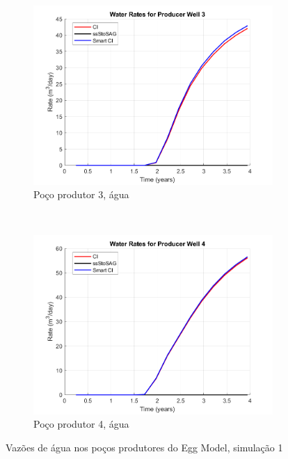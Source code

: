 \begin{figure}[!ht]
	\begin{subfigure}[b]{.45\textwidth}
		\includegraphics[width=\textwidth]{figs/resultadosEgg/imgsim1/EGG_WaterWell3_Zoom}
		\caption{Po\c{c}o produtor 3, \'{a}gua}
		\label{EGG1_WaterWell3}
	\end{subfigure}
	~
	\begin{subfigure}[b]{.45\textwidth}
		\includegraphics[width=\textwidth]{figs/resultadosEgg/imgsim1/EGG_WaterWell4_Zoom}
		\caption{Po\c{c}o produtor 4, \'{a}gua}
		\label{EGG1_WaterWell4}
	\end{subfigure}
\caption{Vaz\~{o}es de \'{a}gua nos po\c{c}os produtores do Egg Model, simula\c{c}\~{a}o 1}
\label{EGG1_WaterRates}
\end{figure}

